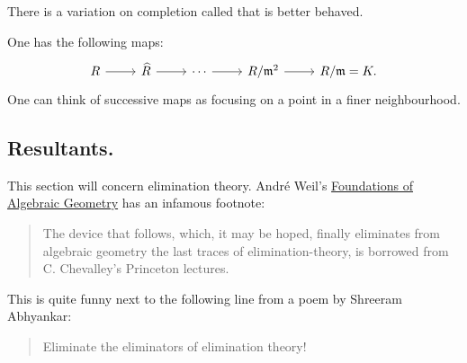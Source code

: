 \documentclass [11 pt, oneside] {article}
\begin{document}
\begin{remark}
	There is a variation on completion called  that is better behaved.
\end{remark}

One has the following maps:
\[
\begin{tikzcd}
	R\ar[r]&\widehat{R}\ar[r] &\cdots\ar[r] & R/\mathfrak{m}^2 \ar[r]& R/\mathfrak{m} = K.
\end{tikzcd}
\]
One can think of successive maps as focusing on a point in a finer neighbourhood.


\subsection{Resultants.}
This section will concern elimination theory. Andr\'e Weil's \ul{Foundations of Algebraic Geometry} has an infamous footnote:
\begin{quote}
	\small 
	The device that follows, which, it may be hoped, finally eliminates from algebraic geometry the last traces of elimination-theory, is borrowed from C. Chevalley's Princeton lectures.
\end{quote}
This is quite funny next to the following line from a poem by Shreeram Abhyankar:
\begin{quote}
	\small 
	Eliminate the eliminators of elimination theory!
\end{quote}
\end{document}
